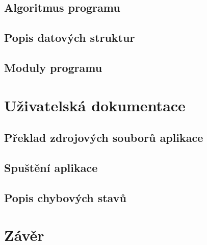 \documentclass[12pt]{article}
\begin{document}
\subsection{Algoritmus programu}
\pagebreak
\subsection{Popis datových struktur}
\subsection{Moduly programu}
%
%

\section{Uživatelská dokumentace}
\subsection{Překlad zdrojových souborů aplikace}
\subsection{Spuštění aplikace}
\newpage
\subsection{Popis chybových stavů}
%
%
\pagebreak
\section{Závěr}
\end{document}
